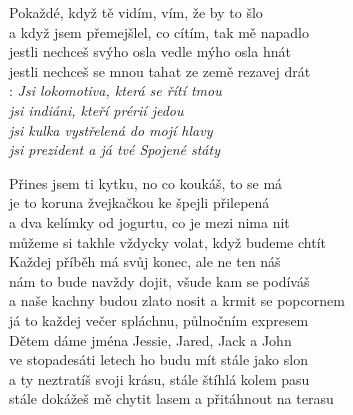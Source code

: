 
Pokaždé, když tě vidím, vím, že by to šlo\\
a když jsem přemejšlel, co cítím, tak mě napadlo\\
jestli nechceš svýho osla vedle mýho osla hnát\\
jestli nechceš se mnou tahat ze země rezavej drát\\

\textregistered:
\emph{
Jsi lokomotiva, která se řítí tmou\\
jsi indiáni, kteří prérií jedou\\
jsi kulka vystřelená do mojí hlavy\\
jsi prezident a já tvé Spojené státy\\
}

Přines jsem ti kytku, no co koukáš, to se má\\
je to koruna žvejkačkou ke špejli přilepená\\
a dva kelímky od jogurtu, co je mezi nima nit\\
můžeme si takhle vždycky volat, když budeme chtít\hspace{1cm} \textregistered\\

Každej příběh má svůj konec, ale ne ten náš\\
nám to bude navždy dojit, všude kam se podíváš\\
a naše kachny budou zlato nosit a krmit se popcornem\\
já to každej večer spláchnu, půlnočním expresem\hspace{1cm} \textregistered\\

Dětem dáme jména Jessie, Jared, Jack a John\\
ve stopadesáti letech ho budu mít stále jako slon\\
a ty neztratíš svoji krásu, stále štíhlá kolem pasu\\
stále dokážeš mě chytit lasem a přitáhnout na terasu\hspace{1cm} \textregistered

\newpage
